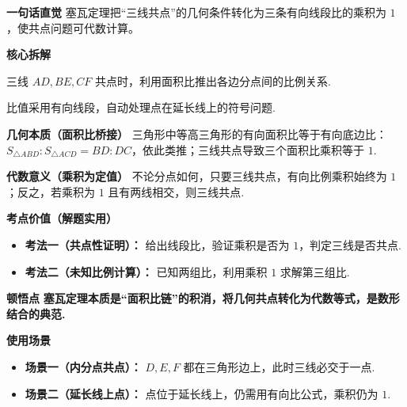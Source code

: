 \begin{explanationbox}
	\textbf{\textcolor{CExplanation}{一句话直觉}}
	塞瓦定理把“三线共点”的几何条件转化为三条有向线段比的乘积为 $1$，使共点问题可代数计算。

	\medskip
	\textbf{\textcolor{CExplanation}{核心拆解}}
	\begin{description}[style=nextline, leftmargin=2.8em, labelsep=0.5em, itemsep=0.45em]
		\item[\textbf{要点一（共点转比例）：}]
			三线 $AD,BE,CF$ 共点时，利用面积比推出各边分点间的比例关系.
		\item[\textbf{要点二（有向比符号）：}]
			比值采用有向线段，自动处理点在延长线上的符号问题.
	\end{description}

	\medskip
	\textbf{\textcolor{CExplanation}{几何本质（面积比桥接）}}
	三角形中等高三角形的有向面积比等于有向底边比：$S_{\triangle ABD}:S_{\triangle ACD}=BD:DC$，依此类推；三线共点导致三个面积比乘积等于 $1$.

	\medskip
	\textbf{\textcolor{CExplanation}{代数意义（乘积为定值）}}
	不论分点如何，只要三线共点，有向比例乘积始终为 $1$；反之，若乘积为 $1$ 且有两线相交，则三线共点.

	\medskip
	\textbf{\textcolor{CExplanation}{考点价值（解题实用）}}
	\begin{itemize}[leftmargin=*, itemsep=0.5em, topsep=0.4em]
		\item \textbf{考法一（共点性证明）：} 给出线段比，验证乘积是否为 $1$，判定三线是否共点.
		\item \textbf{考法二（未知比例计算）：} 已知两组比，利用乘积 $1$ 求解第三组比.
	\end{itemize}

	\medskip
	\textbf{\textcolor{CExplanation}{顿悟点}}
	\textbf{塞瓦定理本质是“面积比链”的积消，将几何共点转化为代数等式，是数形结合的典范.}

	\medskip
	\textbf{\textcolor{CExplanation}{使用场景}}
	\begin{itemize}[leftmargin=*, itemsep=0.5em, topsep=0.4em]
		\item \textbf{场景一（内分点共点）：} $D,E,F$ 都在三角形边上，此时三线必交于一点.
		\item \textbf{场景二（延长线上点）：} 点位于延长线上，仍需用有向比公式，乘积仍为 $1$.
	\end{itemize}

\end{explanationbox}
